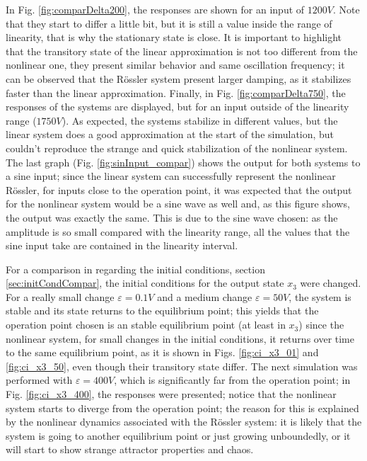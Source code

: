 In Fig. \ref{fig:comparDelta200}, the responses are shown for an input of $1200V$. Note that they start to differ a little bit, but it is still a value inside the range of linearity, that is why the stationary state is close. It is important to highlight that the transitory state of the linear approximation is not too different from the nonlinear one, they present similar behavior and same oscillation frequency; it can be observed that the Rössler system present larger damping, as it stabilizes faster than the linear approximation. Finally, in Fig. \ref{fig:comparDelta750}, the responses of the systems are displayed, but for an input outside of the linearity range ($1750V$). As expected, the systems stabilize in different values, but the linear system does a good approximation at the start of the simulation, but couldn't reproduce the strange and quick stabilization of the nonlinear system. The last graph (Fig. \ref{fig:sinInput_compar}) shows the output for both systems to a sine input; since the linear system can successfully represent the nonlinear Rössler, for inputs close to the operation point, it was expected that the output for the nonlinear system would be a sine wave as well and, as this figure shows, the output was exactly the same. This is due to the sine wave chosen: as the amplitude is so small compared with the linearity range, all the values that the sine input take are contained in the linearity interval.

For a comparison in regarding the initial conditions, section \ref{sec:initCondCompar}, the initial conditions for the output state $x_3$ were changed. For a really small change $\varepsilon=0.1V$ and a medium change $\varepsilon=50V$, the system is stable and its state returns to the equilibrium point; this yields that the operation point chosen is an stable equilibrium point (at least in $x_3$) since the nonlinear system, for small changes in the initial conditions, it returns over time to the same equilibrium point, as it is shown in Figs. \ref{fig:ci_x3_01} and \ref{fig:ci_x3_50}, even though their transitory state differ. The next simulation was performed with $\varepsilon=400V$, which is significantly far from the operation point; in Fig. \ref{fig:ci_x3_400}, the responses were presented; notice that the nonlinear system starts to diverge from the operation point; the reason for this is explained by the nonlinear dynamics associated with the Rössler system: it is likely that the system is going to another equilibrium point or just growing unboundedly, or it will start to show strange attractor properties and chaos.

